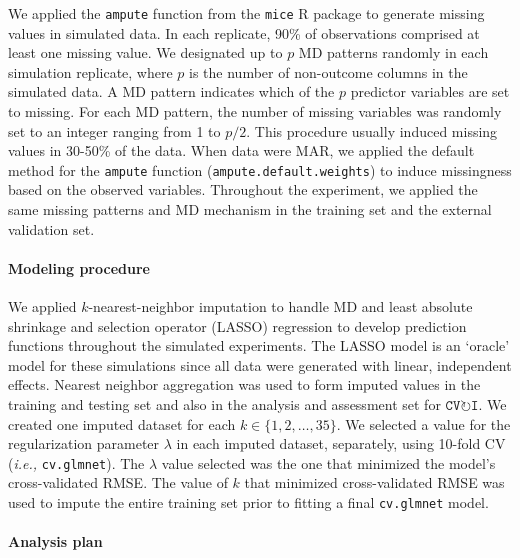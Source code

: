 \documentclass[AMA,STIX1COL,doublespace]{WileyNJD-v2}
\begin{document}
We applied the \texttt{ampute} function from the \texttt{mice} R package
to generate missing values in simulated data.\cite{mice} In each
replicate, 90\% of observations comprised at least one missing value. We
designated up to \(p\) MD patterns randomly in each simulation
replicate, where \(p\) is the number of non-outcome columns in the
simulated data. A MD pattern indicates which of the \(p\) predictor
variables are set to missing. For each MD pattern, the number of missing
variables was randomly set to an integer ranging from 1 to \(p/2\). This
procedure usually induced missing values in 30-50\% of the data. When
data were MAR, we applied the default method for the \texttt{ampute}
function (\texttt{ampute.default.weights}) to induce missingness based
on the observed variables. Throughout the experiment, we applied the
same missing patterns and MD mechanism in the training set and the
external validation set.

\paragraph{Modeling procedure}

We applied \(k\)-nearest-neighbor imputation to handle MD and least
absolute shrinkage and selection operator (LASSO) regression to develop
prediction functions throughout the simulated experiments. The LASSO
model is an `oracle' model for these simulations since all data were
generated with linear, independent effects. Nearest neighbor aggregation
was used to form imputed values in the training and testing set and also
in the analysis and assessment set for
$\texttt{CV}\!\circlearrowright\!\texttt{I}$. We created one imputed
dataset for each \(k \in \lbrace 1, 2, \ldots, 35\rbrace\). We selected
a value for the regularization parameter \(\lambda\) in each imputed
dataset, separately, using 10-fold CV
(\textit{i.e., }\texttt{cv.glmnet}). The \(\lambda\) value selected was
the one that minimized the model's cross-validated RMSE. The value of
\(k\) that minimized cross-validated RMSE was used to impute the entire
training set prior to fitting a final \texttt{cv.glmnet} model.

\paragraph{Analysis plan}
\end{document}
